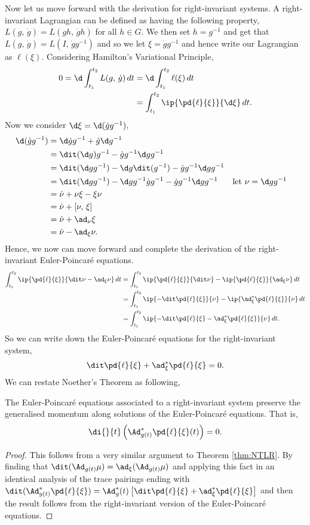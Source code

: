 \noindent
  Now let us move forward with the derivation for right-invariant systems. A right-invariant Lagrangian can be defined as having the following property, $L(g,\,\dot g) = L(gh,\,\dot gh)$ for all $h \in G$. We then set $h = g^{-1}$ and get that $L(g,\,\dot g) = L(I,\,\dot gg^{-1})$ and so we let $\xi = \dot gg^{-1}$ and hence write our Lagrangian as $\ell(\xi)$. Considering Hamilton's Variational Principle,
  \begin{align*}
    0 = \d\int_{t_1}^{t_2} L(g,\,\dot g)\,dt &= \d\int_{t_1}^{t_2} \ell(\xi)\,dt\\
    &= \int_{t_1}^{t_2} \ip{\pd{\ell}{\xi}}{\d\xi}\,dt.
  \end{align*}
  Now we consider $\d\xi = \d(\dot g g^{-1})$,
  \begin{align*}
    \d(\dot g g^{-1}) &= \d\dot g g^{-1} + \dot g\d g^{-1} \\
    &= \dit(\d g)g^{-1} - \dot g g^{-1}\d gg^{-1}\\
    &= \dit(\d g g^{-1}) - \d g\dit(g^{-1}) - \dot g g^{-1}\d gg^{-1}\\
    &= \dit(\d g g^{-1}) - \d gg^{-1}\dot g g^{-1} - \dot g g^{-1}\d gg^{-1} && \text{let $\nu = \d gg^{-1}$}\\
    &= \dot\nu + \nu\xi - \xi\nu \\
    &= \dot\nu + [\nu,\,\xi] \\
    &= \dot \nu + \ad_\nu\xi \\
    &= \dot\nu - \ad_\xi\nu.
  \end{align*}
  Hence, we now can move forward and complete the derivation of the right-invariant Euler-Poincar\'e equations.
  \begin{align*}
    \int_{t_1}^{t_2} \ip{\pd{\ell}{\xi}}{\dit\nu - \ad_\xi\nu}\,dt &= \int_{t_1}^{t_2} \ip{\pd{\ell}{\xi}}{\dit\nu} - \ip{\pd{\ell}{\xi}}{\ad_\xi\nu}\,dt \\
    &= \int_{t_1}^{t_2} \ip{-\dit\pd{\ell}{\xi}}{\nu} - \ip{\ad^*_\xi\pd{\ell}{\xi}}{\nu}\,dt \\
    &= \int_{t_1}^{t_2} \ip{-\dit\pd{\ell}{\xi} -\ad^*_\xi\pd{\ell}{\xi}}{\nu}\,dt.
  \end{align*}
  So we can write down the Euler-Poincar\'e equations for the right-invariant system,
  $$ \dit\pd{\ell}{\xi} + \ad^*_\xi \pd{\ell}{\xi} = 0. $$
  We can restate Noether's Theorem as following,
  \begin{nthm}
    The Euler-Poincar\'e equations associated to a right-invariant system preserve the generalised momentum along solutions of the Euler-Poincar\'e equations. That is,
    $$ \di{}{t} \left(\Ad^*_{g(t)}\pd{\ell}{\xi}(t)\right) = 0. $$
  \end{nthm}
  \begin{proof}
    This follows from a very similar argument to Theorem \ref{thm:NTLR}. By finding that $\dit (\Ad_{g(t)}\mu) = \ad_\xi (\Ad_{g(t)}\mu)$ and applying this fact in an identical analysis of the trace pairings ending with $\dit(\Ad_{g(t)}^*\pd{\ell}{\xi}) = \Ad^*_g(t)\left[ \dit\pd{\ell}{\xi} + \ad_\xi^* \pd{\ell}{\xi} \right]$ and then the result follows from the right-invariant version of the Euler-Poincar\'e equations.
  \end{proof}
